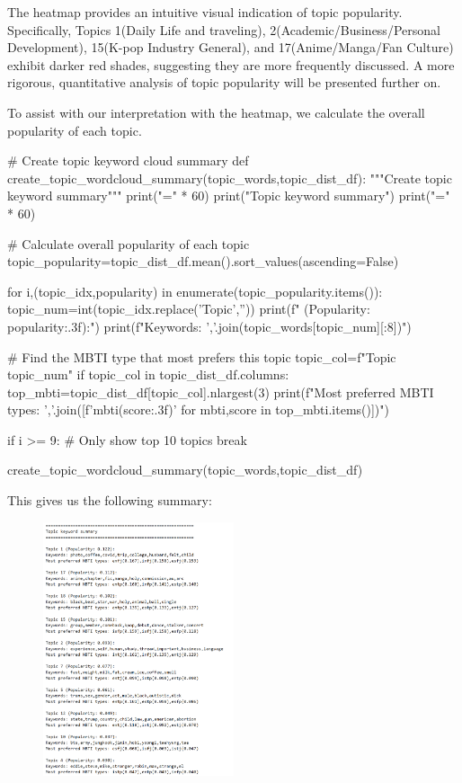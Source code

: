 \documentclass[12pt]{article}
\begin{document}
	The heatmap provides an intuitive visual indication of topic popularity. Specifically, Topics 1(Daily Life and traveling), 2(Academic/Business/Personal Development), 15(K-pop Industry General), and 17(Anime/Manga/Fan Culture) exhibit darker red shades, suggesting they are more frequently discussed. A more rigorous, quantitative analysis of topic popularity will be presented further on.
	
	To assist with our interpretation with the heatmap, we calculate the overall popularity of each topic.
	\begin{python}
# Create topic keyword cloud summary
def create_topic_wordcloud_summary(topic_words,topic_dist_df):
    """Create topic keyword summary"""
    print("=" * 60)
    print("Topic keyword summary")
    print("=" * 60)
    
    # Calculate overall popularity of each topic
    topic_popularity=topic_dist_df.mean().sort_values(ascending=False)
    
    for i,(topic_idx,popularity) in enumerate(topic_popularity.items()):
        topic_num=int(topic_idx.replace('Topic',''))
        print(f" (Popularity: {popularity:.3f}):")
        print(f"Keywords: {','.join(topic_words[topic_num][:8])}")
        
        # Find the MBTI type that most prefers this topic
        topic_col=f"Topic {topic_num}"
        if topic_col in topic_dist_df.columns:
            top_mbti=topic_dist_df[topic_col].nlargest(3)
            print(f"Most preferred MBTI types: {','.join([f'{mbti}({score:.3f})' for mbti,score in top_mbti.items()])}")
        
        if i >= 9:  # Only show top 10 topics
            break


create_topic_wordcloud_summary(topic_words,topic_dist_df)
	\end{python}
	 This gives us the following summary:
	 \begin{figure}[H]
	 		\centering
	 		\includegraphics[width=0.5\textwidth]{Q2topsum} 	
	 \end{figure}
	 
\end{document}
